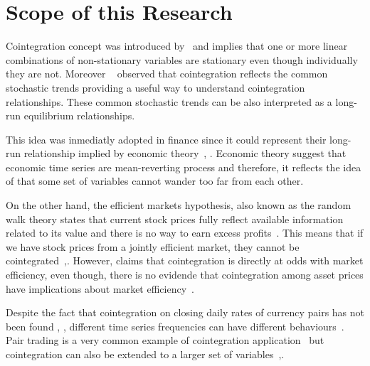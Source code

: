 \section{Scope of this Research}

Cointegration concept was introduced by~\cite{engle1987} and implies that one or
more linear combinations of non-stationary variables are stationary even though
individually they are not.  Moreover ~\cite{stock+watson1988} observed that
cointegration reflects the common stochastic trends providing a useful way to
understand cointegration relationships. These common stochastic trends can be
also interpreted as a long-run equilibrium relationships.

This idea was inmediatly adopted in finance since it could represent their
long-run relationship implied by economic theory~\cite{laietAl1991},
\cite{lence+falk2005}.  Economic theory suggest that economic time series are
mean-reverting process and therefore, it reflects the idea of that some set of
variables cannot wander too far from each other. 

On the other hand, the efficient markets hypothesis, also known as the random
walk theory states that current stock prices fully reflect available
information related to its value and there is no way to earn excess
profits~\cite{fama1970}.  This means that if we have stock prices from a
jointly efficient market, they cannot be
cointegrated~\cite{granger1986},\cite{dwyer1992}. However, \cite{richards1995}
claims that cointegration is directly at odds with market efficiency, even
though, there is no evidende that cointegration among asset prices have
implications about market efficiency~\cite{lence+falk2005}.

Despite the fact that cointegration on closing daily rates of currency pairs has
not been found \cite{coleman1990}, \cite{copeland1991}, different time series
frequencies can have different behaviours~\cite{aldridge2009}. Pair trading is a
very common example of cointegration application~\cite{herlemont2003} 
but cointegration can also be extended to a larger set of
variables~\cite{mukherjee1995},\cite{engle2004}.



